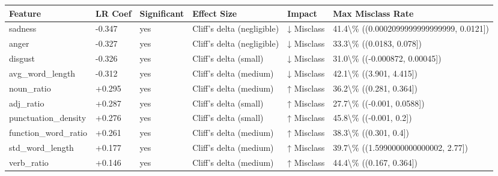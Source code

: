 \begin{tabular}{llllll}
\toprule
Feature & LR Coef & Significant & Effect Size & Impact & Max Misclass Rate \\
\midrule
sadness & -0.347 & yes & Cliff's delta (negligible) & ↓ Misclass & 41.4\textbackslash \% ((0.0002099999999999999, 0.0121]) \\
anger & -0.327 & yes & Cliff's delta (negligible) & ↓ Misclass & 33.3\textbackslash \% ((0.0183, 0.078]) \\
disgust & -0.326 & yes & Cliff's delta (small) & ↓ Misclass & 31.0\textbackslash \% ((-0.000872, 0.00045]) \\
avg\_word\_length & -0.312 & yes & Cliff's delta (medium) & ↓ Misclass & 42.1\textbackslash \% ((3.901, 4.415]) \\
noun\_ratio & +0.295 & yes & Cliff's delta (medium) & ↑ Misclass & 36.2\textbackslash \% ((0.281, 0.364]) \\
adj\_ratio & +0.287 & yes & Cliff's delta (small) & ↑ Misclass & 27.7\textbackslash \% ((-0.001, 0.0588]) \\
punctuation\_density & +0.276 & yes & Cliff's delta (small) & ↑ Misclass & 45.8\textbackslash \% ((-0.001, 0.2]) \\
function\_word\_ratio & +0.261 & yes & Cliff's delta (medium) & ↑ Misclass & 38.3\textbackslash \% ((0.301, 0.4]) \\
std\_word\_length & +0.177 & yes & Cliff's delta (medium) & ↑ Misclass & 39.7\textbackslash \% ((1.5990000000000002, 2.77]) \\
verb\_ratio & +0.146 & yes & Cliff's delta (medium) & ↑ Misclass & 44.4\textbackslash \% ((0.167, 0.364]) \\
\bottomrule
\end{tabular}
